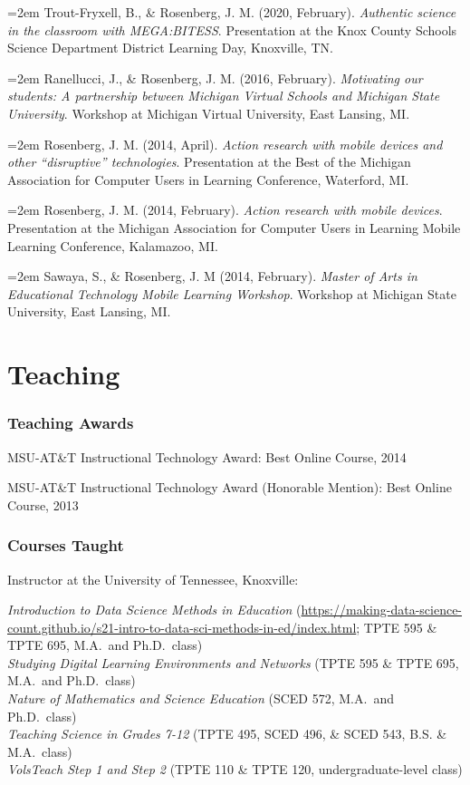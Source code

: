 \documentclass[
  14,
]{article}
\begin{document}
\hangindent=2em Trout-Fryxell, B., \& Rosenberg, J. M. (2020, February).
\emph{Authentic science in the classroom with MEGA:BITESS}. Presentation
at the Knox County Schools Science Department District Learning Day,
Knoxville, TN.

\hangindent=2em Ranellucci, J., \& Rosenberg, J. M. (2016, February).
\emph{Motivating our students: A partnership between Michigan Virtual
Schools and Michigan State University}. Workshop at Michigan Virtual
University, East Lansing, MI.

\hangindent=2em Rosenberg, J. M. (2014, April). \emph{Action research
with mobile devices and other ``disruptive'' technologies}. Presentation
at the Best of the Michigan Association for Computer Users in Learning
Conference, Waterford, MI.

\hangindent=2em Rosenberg, J. M. (2014, February). \emph{Action research
with mobile devices}. Presentation at the Michigan Association for
Computer Users in Learning Mobile Learning Conference, Kalamazoo, MI.

\hangindent=2em Sawaya, S., \& Rosenberg, J. M (2014, February).
\emph{Master of Arts in Educational Technology Mobile Learning
Workshop}. Workshop at Michigan State University, East Lansing, MI.

\hypertarget{teaching}{%
\section{Teaching}\label{teaching}}

\hypertarget{teaching-awards}{%
\subsubsection{Teaching Awards}\label{teaching-awards}}

MSU-AT\&T Instructional Technology Award: Best Online Course, 2014

MSU-AT\&T Instructional Technology Award (Honorable Mention): Best
Online Course, 2013

\hypertarget{courses-taught}{%
\subsubsection{Courses Taught}\label{courses-taught}}

Instructor at the University of Tennessee, Knoxville:

\emph{Introduction to Data Science Methods in Education}
(\url{https://making-data-science-count.github.io/s21-intro-to-data-sci-methods-in-ed/index.html};
TPTE 595 \& TPTE 695, M.A.~and Ph.D.~class)\\
\emph{Studying Digital Learning Environments and Networks} (TPTE 595 \&
TPTE 695, M.A.~and Ph.D.~class)\\
\emph{Nature of Mathematics and Science Education} (SCED 572, M.A.~and
Ph.D.~class)\\
\emph{Teaching Science in Grades 7-12} (TPTE 495, SCED 496, \& SCED 543,
B.S. \& M.A.~class)\\
\emph{VolsTeach Step 1 and Step 2} (TPTE 110 \& TPTE 120,
undergraduate-level class)
\end{document}
